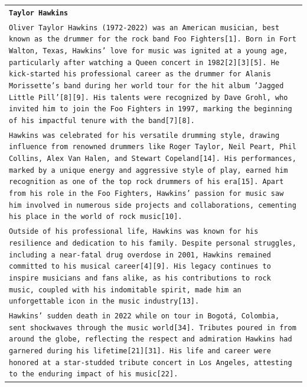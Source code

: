 \documentclass[11pt]{article}
\begin{document}
\onecolumn
\renewcommand{\arraystretch}{1.5} %
\begin{longtable}{p{\textwidth}}
\toprule
\texttt{\small{\textbf{Taylor Hawkins}}} \\
\texttt{\small{Oliver Taylor Hawkins (1972-2022) was an American musician, best known as the drummer for the rock band Foo Fighters[1]. Born in Fort Walton, Texas, Hawkins' love for music was ignited at a young age, particularly after watching a Queen concert in 1982[2][3][5]. He kick-started his professional career as the drummer for Alanis Morissette’s band during her world tour for the hit album 'Jagged Little Pill'[8][9]. His talents were recognized by Dave Grohl, who invited him to join the Foo Fighters in 1997, marking the beginning of his impactful tenure with the band[7][8].}} \\
\texttt{\small{Hawkins was celebrated for his versatile drumming style, drawing influence from renowned drummers like Roger Taylor, Neil Peart, Phil Collins, Alex Van Halen, and Stewart Copeland[14]. His performances, marked by a unique energy and aggressive style of play, earned him recognition as one of the top rock drummers of his era[15]. Apart from his role in the Foo Fighters, Hawkins' passion for music saw him involved in numerous side projects and collaborations, cementing his place in the world of rock music[10].}} \\
\texttt{\small{Outside of his professional life, Hawkins was known for his resilience and dedication to his family. Despite personal struggles, including a near-fatal drug overdose in 2001, Hawkins remained committed to his musical career[4][9]. His legacy continues to inspire musicians and fans alike, as his contributions to rock music, coupled with his indomitable spirit, made him an unforgettable icon in the music industry[13].}} \\
\texttt{\small{Hawkins' sudden death in 2022 while on tour in Bogotá, Colombia, sent shockwaves through the music world[34]. Tributes poured in from around the globe, reflecting the respect and admiration Hawkins had garnered during his lifetime[21][31]. His life and career were honored at a star-studded tribute concert in Los Angeles, attesting to the enduring impact of his music[22].}} \\


\end{longtable}
\end{document}
